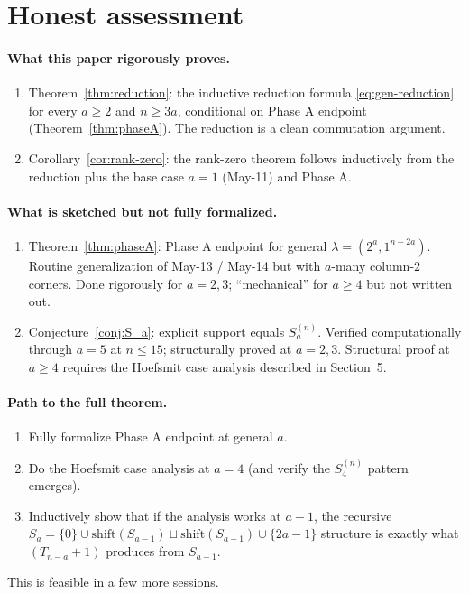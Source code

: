 \documentclass[11pt]{article}
\theoremstyle{definition}
\begin{document}
\section{Honest assessment}\label{sec:honest}

\paragraph{What this paper rigorously proves.}
\begin{enumerate}[leftmargin=2em,topsep=0.3em,itemsep=0.2em]
\item Theorem~\ref{thm:reduction}: the inductive reduction formula
\eqref{eq:gen-reduction} for every $a\ge 2$ and $n\ge 3a$,
conditional on Phase A endpoint (Theorem~\ref{thm:phaseA}).
The reduction is a clean commutation argument.
\item Corollary~\ref{cor:rank-zero}: the rank-zero theorem
follows inductively from the reduction plus the base case $a=1$
(May-11) and Phase A.
\end{enumerate}

\paragraph{What is sketched but not fully formalized.}
\begin{enumerate}[leftmargin=2em,topsep=0.3em,itemsep=0.2em]
\item Theorem~\ref{thm:phaseA}: Phase A endpoint for general
$\lambda=(2^a,1^{n-2a})$.  Routine generalization of May-13 /
May-14 but with $a$-many column-$2$ corners.  Done rigorously for
$a=2,3$; ``mechanical'' for $a\ge 4$ but not written out.
\item Conjecture~\ref{conj:S_a}: explicit support equals
$S_a^{(n)}$.  Verified computationally through $a=5$ at $n\le 15$;
structurally proved at $a=2,3$.  Structural proof at $a\ge 4$
requires the Hoefsmit case analysis described in
Section~5.
\end{enumerate}

\paragraph{Path to the full theorem.}
\begin{enumerate}[leftmargin=2em,topsep=0.3em,itemsep=0.2em,
label=(\arabic*)]
\item Fully formalize Phase A endpoint at general $a$.
\item Do the Hoefsmit case analysis at $a=4$ (and verify the
$S_4^{(n)}$ pattern emerges).
\item Inductively show that if the analysis works at $a-1$, the
recursive $S_a=\{0\}\cup\mathrm{shift}(S_{a-1})\sqcup
\mathrm{shift}(S_{a-1})\cup\{2a{-}1\}$ structure is exactly what
$(T_{n-a}{+}1)$ produces from $S_{a-1}$.
\end{enumerate}
This is feasible in a few more sessions.
\end{document}
